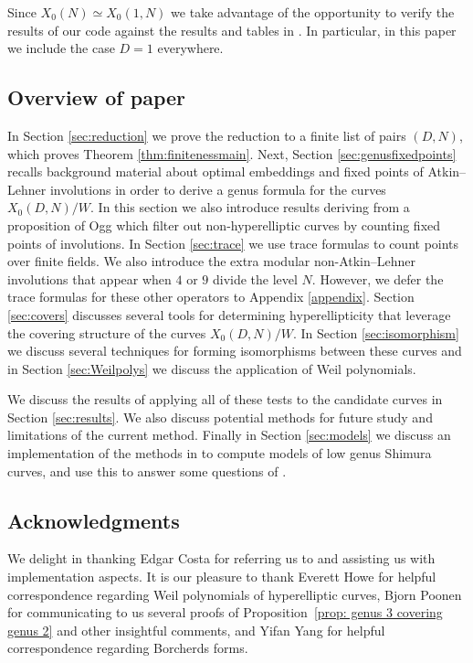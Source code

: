 \documentclass[12pt]{amsart}
\numberwithin{equation}{subsection}
\theoremstyle{plain}\newtheorem{ithm}{Theorem}
\theoremstyle{plain}\newtheorem{iprop}[ithm]{Proposition}
\theoremstyle{definition}
\theoremstyle{remark}
\newcommand{\Curve}[2]{X_0({#1},{#2})} %
\begin{document}
Since $X_0(N) \simeq \Curve{1}{N}$ we take advantage of the opportunity to verify the results of our code against the results and tables in \cite{HH96, HasegawaStarcurves, FH99}. 
In particular, in this paper we include the case $D = 1$ everywhere.




\subsection{Overview of paper}

In Section \ref{sec:reduction} we prove the reduction to a finite list of pairs $(D,N)$, which proves Theorem \ref{thm:finitenessmain}. Next, Section \ref{sec:genusfixedpoints} recalls  background material about optimal embeddings and fixed points of Atkin--Lehner involutions in order to derive a genus formula for the curves $\Curve{D}{N}/W$.  In this section we also introduce results deriving from a proposition of Ogg which filter out non-hyperelliptic curves by counting fixed points of involutions.
In Section \ref{sec:trace} we use trace formulas to count points over finite fields. We also introduce the extra modular non-Atkin--Lehner involutions that appear when $4$ or $9$ divide the level $N$. However, we defer the trace formulas for these other operators to Appendix \ref{appendix}. Section \ref{sec:covers} discusses several tools for determining hyperellipticity that leverage the covering structure of the curves  $\Curve{D}{N}/W$. In Section \ref{sec:isomorphism} we discuss several techniques for forming isomorphisms between these curves and in Section \ref{sec:Weilpolys} we discuss the application of Weil polynomials.

We discuss the results of applying all of these tests to the candidate curves in Section \ref{sec:results}. We also discuss potential methods for future study and limitations of the current method. Finally in Section \ref{sec:models} we discuss an implementation of the methods in \cite{GY17} to compute models of low genus Shimura curves, and use this to answer some questions of \cite{OanaFreddy}.

\subsection{Acknowledgments}
 We delight in thanking Edgar Costa for referring us to \cite{CostaWeilPolys} and assisting us with implementation aspects.
 It is our pleasure to thank Everett Howe for helpful correspondence regarding Weil polynomials of hyperelliptic curves, Bjorn Poonen for communicating to us several proofs of Proposition~\ref{prop: genus 3 covering genus 2} and other insightful comments, and Yifan Yang for helpful correspondence regarding Borcherds forms.
\end{document}
